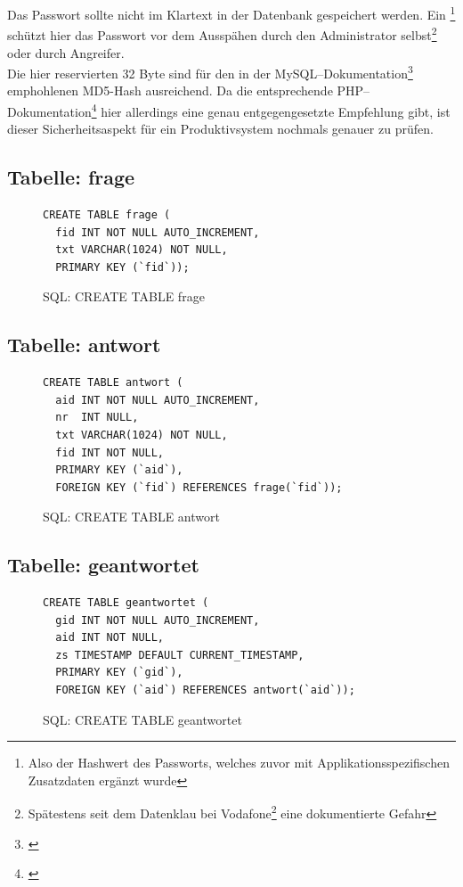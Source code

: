 Das Passwort sollte nicht im Klartext in der Datenbank gespeichert werden. Ein \footnote{Also der Hashwert des Passworts, welches zuvor mit Applikationsspezifischen Zusatzdaten ergänzt wurde} schützt hier das Passwort vor dem Ausspähen durch den Administrator selbst\footnote{Spätestens seit dem Datenklau bei Vodafone\footnote{\cite{vodafone}} eine dokumentierte Gefahr} oder durch Angreifer.\\
Die hier reservierten 32 Byte sind für den in der MySQL--Dokumentation\footnote{\cite{mysql-pcrypt}} emphohlenen MD5-Hash ausreichend. Da die entsprechende PHP--Dokumentation\footnote{\cite{php-pcrypt}} hier allerdings eine genau entgegengesetzte Empfehlung gibt, ist dieser Sicherheitsaspekt für ein Produktivsystem nochmals genauer zu prüfen.

\subsection{Tabelle: frage}
\begin{figure}[h]
\begin{verbatim}
CREATE TABLE frage (
  fid INT NOT NULL AUTO_INCREMENT,
  txt VARCHAR(1024) NOT NULL,
  PRIMARY KEY (`fid`));
\end{verbatim}
\caption{SQL: CREATE TABLE frage}
\label{sql:tblfrage}
\end{figure}

\subsection{Tabelle: antwort}
\begin{figure}[h]
\begin{verbatim}
CREATE TABLE antwort (
  aid INT NOT NULL AUTO_INCREMENT,
  nr  INT NULL,
  txt VARCHAR(1024) NOT NULL,
  fid INT NOT NULL,
  PRIMARY KEY (`aid`),
  FOREIGN KEY (`fid`) REFERENCES frage(`fid`));
\end{verbatim}
\caption{SQL: CREATE TABLE antwort}
\label{sql:tblantwort}
\end{figure}

\subsection{Tabelle: geantwortet}
\begin{figure}[h]
\begin{verbatim}
CREATE TABLE geantwortet (
  gid INT NOT NULL AUTO_INCREMENT,
  aid INT NOT NULL,
  zs TIMESTAMP DEFAULT CURRENT_TIMESTAMP,
  PRIMARY KEY (`gid`),
  FOREIGN KEY (`aid`) REFERENCES antwort(`aid`));
\end{verbatim}
\caption{SQL: CREATE TABLE geantwortet}
\label{sql:tblgeantwortet}
\end{figure}

